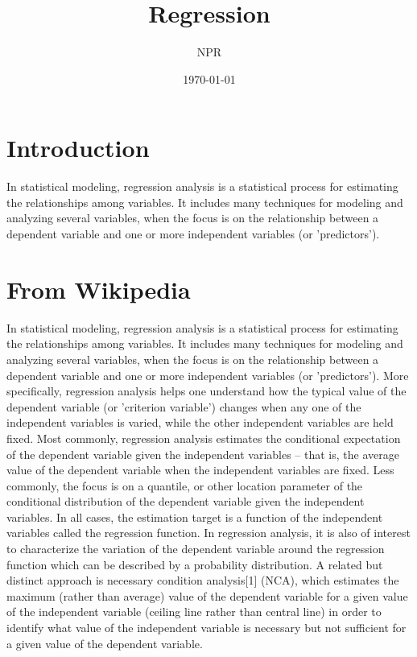 \documentclass[11pt,a4paper]{article}
\begin{document}
\title{Regression}
\author{NPR}
\date{\today}
\maketitle



\section{Introduction}
In statistical modeling, regression analysis is a statistical process
for estimating the relationships among variables. It includes many
techniques for modeling and analyzing several variables, when the
focus is on the relationship between a dependent variable and one or
more independent variables (or 'predictors').



\section{From Wikipedia}
In statistical modeling, regression analysis is a statistical process for estimating the relationships among variables. It includes many techniques for modeling and analyzing several variables, when the focus is on the relationship between a dependent variable and one or more independent variables (or 'predictors'). More specifically, regression analysis helps one understand how the typical value of the dependent variable (or 'criterion variable') changes when any one of the independent variables is varied, while the other independent variables are held fixed. Most commonly, regression analysis estimates the conditional expectation of the dependent variable given the independent variables – that is, the average value of the dependent variable when the independent variables are fixed. Less commonly, the focus is on a quantile, or other location parameter of the conditional distribution of the dependent variable given the independent variables. In all cases, the estimation target is a function of the independent variables called the regression function. In regression analysis, it is also of interest to characterize the variation of the dependent variable around the regression function which can be described by a probability distribution. A related but distinct approach is necessary condition analysis[1] (NCA), which estimates the maximum (rather than average) value of the dependent variable for a given value of the independent variable (ceiling line rather than central line) in order to identify what value of the independent variable is necessary but not sufficient for a given value of the dependent variable.
\end{document}
